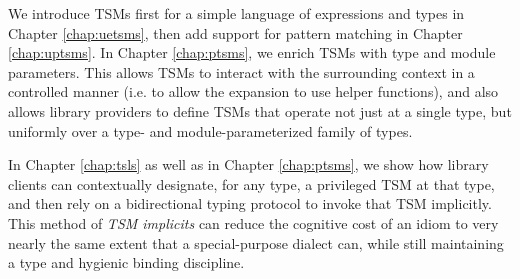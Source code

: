 We  introduce TSMs first for a simple language of expressions and types in Chapter \ref{chap:uetsms}, then add support for pattern matching  in Chapter \ref{chap:uptsms}. In Chapter \ref{chap:ptsms}, we enrich TSMs with type and module parameters. This allows TSMs to interact with the surrounding context in a controlled manner (i.e. to allow the expansion to use helper functions), and also allows library providers to define TSMs that operate not just at a single type, but uniformly over a type- and module-parameterized family of types.

In Chapter \ref{chap:tsls} as well as in Chapter \ref{chap:ptsms}, we show how library clients can contextually designate, for any type, a privileged TSM at that type, and then rely on a bidirectional typing protocol to invoke that TSM implicitly. This method of \emph{TSM implicits} can reduce the cognitive cost of an idiom to very nearly the same extent that a special-purpose dialect can, while still maintaining a type and hygienic binding discipline.

